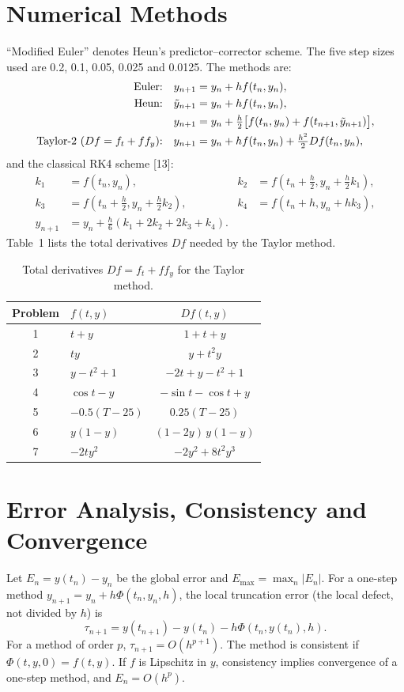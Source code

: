 \documentclass[10pt,letterpaper]{article}
\begin{document}
\section{Numerical Methods}
``Modified Euler'' denotes Heun's predictor--corrector scheme. The five step sizes used are 0.2, 0.1, 0.05, 0.025 and 0.0125. The methods are:
\begin{align}
\text{Euler:}\quad & y_{n+1}=y_n+hf(t_n,y_n),\\
\text{Heun:}\quad & \tilde y_{n+1}=y_n+hf(t_n,y_n),\notag\\
& y_{n+1}=y_n+\tfrac h2\big[f(t_n,y_n)+f(t_{n+1},\tilde y_{n+1})\big],\label{eq:heun}\\
\text{Taylor-2 ($Df=f_t+ff_y$):}\quad & y_{n+1}=y_n+hf(t_n,y_n)+\tfrac{h^2}{2}Df(t_n,y_n),\label{eq:taylor}
\end{align}
and the classical RK4 scheme [13]:
\begin{align}
k_1&=f(t_n,y_n), & k_2&=f(t_n+\tfrac h2,y_n+\tfrac h2k_1),\\
k_3&=f(t_n+\tfrac h2,y_n+\tfrac h2k_2), & k_4&=f(t_n+h,y_n+hk_3),\\
y_{n+1}&=y_n+\tfrac h6(k_1+2k_2+2k_3+k_4).
\end{align}
Table~1 lists the total derivatives $Df$ needed by the Taylor method.

\begin{table}[H]\centering
\caption{Total derivatives $Df=f_t+ff_y$ for the Taylor method.}
\begin{tabular}{@{}clc@{}}\toprule
Problem & $f(t,y)$ & $Df(t,y)$\\\midrule
1 & $t+y$ & $1+t+y$\\
2 & $ty$ & $y+t^2y$\\
3 & $y-t^2+1$ & $-2t+y-t^2+1$\\
4 & $\cos t-y$ & $-\sin t-\cos t+y$\\
5 & $-0.5(T-25)$ & $0.25(T-25)$\\
6 & $y(1-y)$ & $(1-2y)\,y(1-y)$\\
7 & $-2ty^2$ & $-2y^2+8t^2y^3$\\\bottomrule
\end{tabular}
\end{table}

\section{Error Analysis, Consistency and Convergence}
Let $E_n=y(t_n)-y_n$ be the global error and $E_{\max}=\max_n|E_n|$. For a one-step method $y_{n+1}=y_n+h\Phi(t_n,y_n,h)$, the local truncation error (the local defect, not divided by $h$) is
\begin{equation}
\tau_{n+1}=y(t_{n+1})-y(t_n)-h\Phi(t_n,y(t_n),h).\label{eq:lte}
\end{equation}
For a method of order $p$, $\tau_{n+1}=O(h^{p+1})$. The method is consistent if $\Phi(t,y,0)=f(t,y)$. If $f$ is Lipschitz in $y$, consistency implies convergence of a one-step method, and $E_n=O(h^{p})$.
\end{document}
